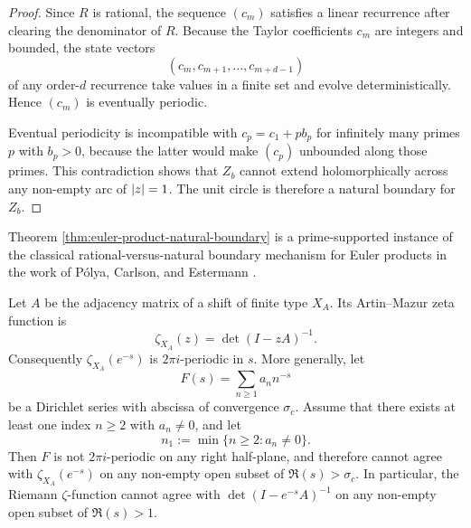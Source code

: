 \begin{proof}
  Since \(R\) is rational, the sequence \((c_m)\) satisfies a linear
  recurrence after clearing the denominator of \(R\). Because the Taylor
  coefficients \(c_m\) are integers and bounded, the state vectors
  \[
    (c_m,c_{m+1},\dots,c_{m+d-1})
  \]
  of any order-\(d\) recurrence take values in a finite set and evolve
  deterministically. Hence \((c_m)\) is eventually periodic.

  Eventual periodicity is incompatible with \(c_p=c_1+p b_p\) for
  infinitely many primes \(p\) with \(b_p>0\), because the latter would
  make \((c_p)\) unbounded along those primes. This contradiction shows
  that \(Z_b\) cannot extend holomorphically across any non-empty arc of
  \(\lvert z \rvert=1\). The unit circle is therefore a natural boundary for
  \(Z_b\).
\end{proof}

\begin{remark}
  Theorem \ref{thm:euler-product-natural-boundary} is a
  prime-supported instance of the classical rational-versus-natural
  boundary mechanism for Euler products in the work of P\'olya, Carlson,
  and Estermann \cite{Polya1923,Carlson1921,Estermann1928}.
\end{remark}

\begin{proposition}[Periodic determinant models after the change of variables \(z=e^{-s}\)]
  \label{prop:finite-zeta-imaginary-periodicity}
  Let \(A\) be the adjacency matrix of a shift of finite type \(X_A\).
  Its Artin--Mazur zeta function is
  \[
    \zeta_{X_A}(z)=\det(I-zA)^{-1}.
  \]
  Consequently \(\zeta_{X_A}(e^{-s})\) is \(2\pi i\)-periodic in \(s\).
  More generally, let
  \[
    F(s)=\sum_{n\ge 1} a_n n^{-s}
  \]
  be a Dirichlet series with abscissa of convergence \(\sigma_c\). Assume
  that there exists at least one index \(n\ge 2\) with \(a_n\neq 0\),
  and let
  \[
    n_1:=\min\{n\ge 2:a_n\neq 0\}.
  \]
  Then \(F\) is not \(2\pi i\)-periodic on any right half-plane, and
  therefore cannot agree with \(\zeta_{X_A}(e^{-s})\) on any non-empty
  open subset of \(\Re(s)>\sigma_c\). In particular, the Riemann
  \(\zeta\)-function cannot agree with \(\det(I-e^{-s}A)^{-1}\) on any
  non-empty open subset of \(\Re(s)>1\).
\end{proposition}

